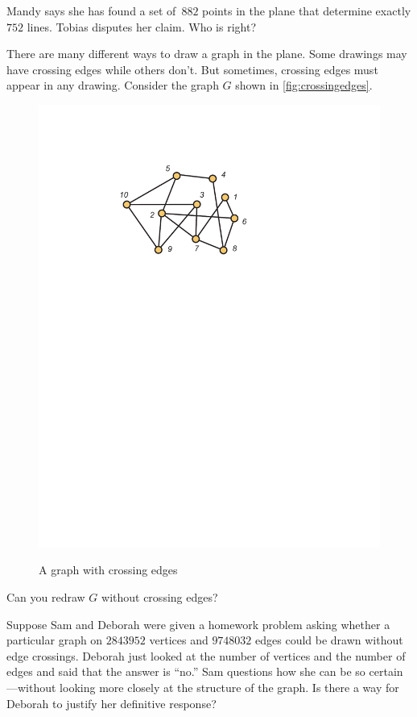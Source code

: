 \begin{example}
Mandy says she has found a set of~$882$ points in the plane that
determine exactly $752$ lines.  Tobias disputes her claim.
Who is right?
\end{example}

\begin{example}
There are many different ways to draw a graph in the plane. Some
drawings may have crossing edges while others don't.  But sometimes, crossing
edges must appear in any drawing.
Consider the graph $G$ shown in \autoref{fig:crossingedges}.
\begin{figure}
\begin{center}
\includegraphics[viewport=132 509 372 683, scale=.6]{intro-figs/3012-fig8}\\
\end{center}
\caption{A graph with crossing edges}
\label{fig:crossingedges}
\end{figure}
Can you redraw $G$ without crossing edges?

Suppose Sam and Deborah were given a homework problem asking whether a
particular graph on $2843952$ vertices and $9748032$ edges could be
drawn without edge crossings.  Deborah just looked at the number of
vertices and the number of edges and said that the answer is ``no.''
Sam questions how she can be so certain---without looking more
closely at the structure of the graph.  Is there a way for
Deborah to justify her definitive response?
\end{example}

